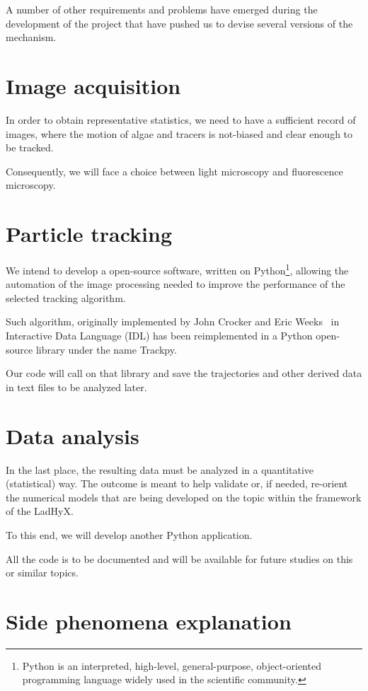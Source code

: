 A number of other requirements and problems have emerged during the development of the project that have pushed us to devise several versions of the mechanism.

\section{Image acquisition}

In order to obtain representative statistics, we need to have a sufficient record of images, where the motion of algae and tracers is not-biased and clear enough to be tracked.

Consequently, we will face a choice between light microscopy and fluorescence microscopy.

\section{Particle tracking}

We intend to develop a open-source software, written on Python\footnote{Python is an interpreted, high-level, general-purpose, object-oriented programming language widely used in the scientific community.}, allowing the automation of the image processing needed to improve the performance of the selected tracking algorithm.

Such algorithm, originally implemented by John Crocker and Eric Weeks~\cite{Crocker} in Interactive Data Language (IDL) has been reimplemented in a Python open-source library under the name Trackpy.

Our code will call on that library and save the trajectories and other derived data in text files to be analyzed later. 

\section{Data analysis}

In the last place, the resulting data must be analyzed in a quantitative (statistical) way. The outcome is meant to help validate or, if needed, re-orient the numerical models that are being developed on the topic within the framework of the LadHyX.

To this end, we will develop another Python application.

All the code is to be documented and will be available for future studies on this or similar topics.

\section{Side phenomena explanation}

